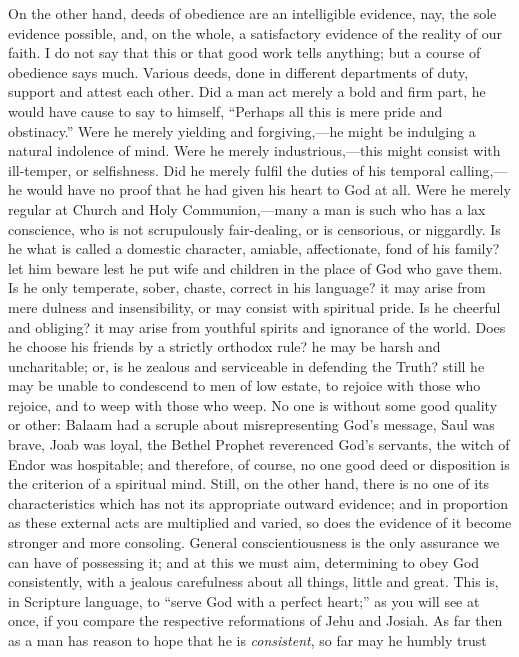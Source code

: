 On the other hand, deeds of obedience are an intelligible evidence,
nay, the sole evidence possible, and, on the whole, a satisfactory
evidence of the reality of our faith. I do not say that this or that
good work tells anything; but a course of obedience says much. Various
deeds, done in different departments of duty, support and attest each
other. Did a man act merely a bold and firm part, he would have cause to
say to himself, ``Perhaps all this is mere pride and
obstinacy.'' Were he merely yielding and forgiving,—he might be
indulging a natural indolence of mind. Were he merely industrious,—this
might consist with ill-temper, or selfishness. Did he merely fulfil the
duties of his temporal calling,—he would have no proof that he had
given his heart to God at all. Were he merely regular at Church and Holy
Communion,—many a man is such who has a lax conscience, who is not
scrupulously fair-dealing, or is censorious, or niggardly. Is he what is
called a domestic character, amiable, affectionate, fond of his family?
let him beware lest he put wife and children in the place of God who
gave them. Is he only temperate, sober, chaste, correct in his language?
it may arise from mere dulness and insensibility, or may consist with
spiritual pride. Is he cheerful and obliging? it may arise from youthful
spirits and ignorance of the world. Does he choose his friends by a
strictly orthodox rule? he may be harsh and uncharitable; or, is he
zealous and serviceable in defending the Truth? still he may be unable
to condescend to men of low estate, to rejoice with those who rejoice,
and to weep with those who weep. No one is without some good quality or
other: Balaam had a scruple about misrepresenting God's message, Saul
was brave, Joab was loyal, the Bethel Prophet reverenced God's servants,
the witch of Endor was hospitable; and therefore, of course, no one good
deed or disposition is the criterion of a spiritual mind. Still, on the
other hand, there is no one of its characteristics which has not its
appropriate outward evidence; and in proportion as these external acts
are multiplied and varied, so does the evidence of it become stronger
and more consoling. General conscientiousness is the only assurance we
can have of possessing it; and at this we must aim, determining to obey
God consistently, with a jealous carefulness about all things, little
and great. This is, in Scripture language, to ``serve God with a
perfect heart;'' as you will see at once, if you compare the
respective reformations of Jehu and Josiah. As far then as a man has
reason to hope that he is \emph{consistent}, so far may he humbly trust
